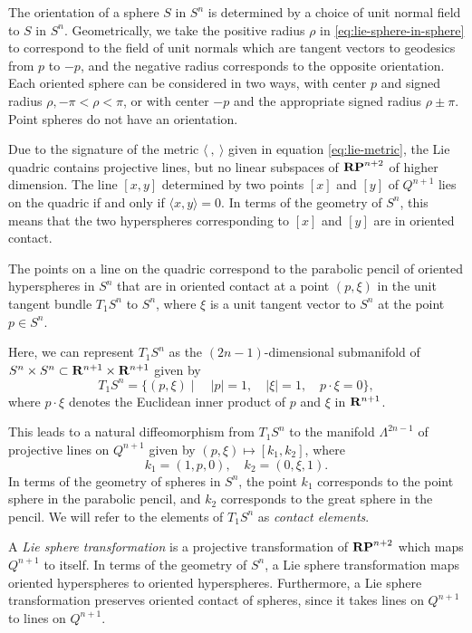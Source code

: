 \documentclass[12pt]{article}
\begin{document}
{The orientation of a sphere $S$ in $S^n$ is
determined by a choice of unit normal field to $S$ in $S^n$.  Geometrically, we take the positive radius $\rho$
in \eqref{eq:lie-sphere-in-sphere} 
to correspond to the field of unit normals which are tangent vectors to geodesics from $p$ to $-p$,
and the negative radius corresponds to the opposite orientation.
Each oriented sphere can be considered in two ways, with center $p$ and signed radius $\rho, - \pi < \rho < \pi$,
or with center $-p$ and the appropriate signed radius $\rho \pm \pi$.  Point spheres do not have an orientation.


Due to the signature of the metric $\langle \ ,\ \rangle$ given in equation \eqref{eq:lie-metric},
the Lie quadric contains projective lines, but no linear
subspaces of ${\bf RP}^{n+2}$ of higher dimension.  The line
$[x,y]$ determined by two points $[x]$ and $[y]$ of $Q^{n+1}$
lies on the quadric if and only if $\langle x,y \rangle =0$.  In terms of the
geometry of $S^n$,
this means that the two hyperspheres corresponding
to $[x]$ and $[y]$ are in oriented contact.  

The points
on a line on the quadric correspond to the parabolic pencil of oriented
hyperspheres in $S^n$ that are in oriented contact at a point $(p,\xi )$ in the
unit tangent bundle $T_1 S^n$ to $S^n$, where $\xi$ is a unit
tangent vector to $S^n$ at the point $p \in S^n$. 

Here, we can represent
$T_1S^n$ as the $(2n-1)$-dimensional submanifold of 
$S^n \times S^n \subset{\bf R}^{n+1} \times {\bf R}^{n+1}$ given by
\begin{equation}
\label{eq:3.1.1}
T_1S^n = \{(p, \xi) \mid \quad |p| =1, \quad |\xi| = 1, \quad p \cdot \xi = 0\},
\end{equation}
where $ p \cdot \xi$ denotes the Euclidean inner product of $p$ and $\xi$ in ${\bf R}^{n+1}$.

This leads to a
natural diffeomorphism from $T_1 S^n$ to the manifold
$\Lambda ^{2n-1}$ of projective lines on $Q^{n+1}$ given by
$(p,\xi) \mapsto[k_1, k_2]$, where 
\begin{displaymath}
k_1 = (1,p,0), \quad k_2 = (0,\xi,1).  
\end{displaymath}
In terms of the geometry of spheres in
$S^n$, the point $k_1$ corresponds to the point sphere in the parabolic
pencil, and $k_2$ corresponds to the great sphere in the pencil.
We will refer to 
the elements of $T_1 S^n$ as {\em contact elements}.

A {\em Lie sphere transformation} is a projective
transformation of ${\bf RP}^{n+2}$ which maps $Q^{n+1}$ to
itself.  In terms of the geometry of $S^n$, a Lie sphere
transformation maps oriented hyperspheres to
oriented hyperspheres.  Furthermore, a Lie
sphere transformation preserves oriented contact
of spheres, since it takes lines on $Q^{n+1}$ to lines on
$Q^{n+1}$.  

}
\end{document}
